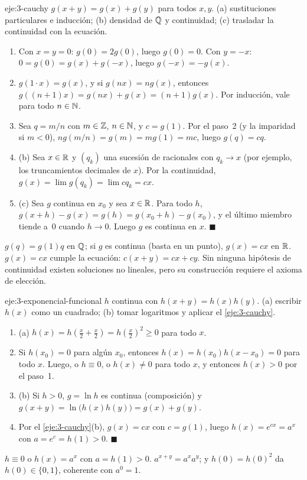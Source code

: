 \begin{solucion}{eje:3-cauchy}
\datos $g(x+y)=g(x)+g(y)$ para todos $x,y$.
\planteamiento (a) sustituciones particulares e inducción; (b) densidad de $\mathbb{Q}$ y continuidad; (c) trasladar la continuidad con la ecuación.
\pasos
\begin{enumerate}[label=\arabic*.]
  \item Con $x=y=0$: $g(0)=2g(0)$, luego $g(0)=0$. Con $y=-x$: $0=g(0)=g(x)+g(-x)$, luego $g(-x)=-g(x)$.
  \item $g(1\cdot x)=g(x)$, y si $g(nx)=ng(x)$, entonces $g((n+1)x)=g(nx)+g(x)=(n+1)g(x)$. Por inducción, vale para todo $n\in\mathbb{N}$.
  \item Sea $q=m/n$ con $m\in\mathbb{Z}$, $n\in\mathbb{N}$, y $c=g(1)$. Por el paso~2 (y la imparidad si $m<0$), $ng(m/n)=g(m)=mg(1)=mc$, luego $g(q)=cq$.
  \item (b) Sea $x\in\mathbb{R}$ y $(q_k)$ una sucesión de racionales con $q_k\to x$ (por ejemplo, los truncamientos decimales de $x$). Por la continuidad, $g(x)=\lim g(q_k)=\lim cq_k=cx$.
  \item (c) Sea $g$ continua en $x_0$ y sea $x\in\mathbb{R}$. Para todo $h$, $g(x+h)-g(x)=g(h)=g(x_0+h)-g(x_0)$, y el último miembro tiende a~0 cuando $h\to0$. Luego $g$ es continua en $x$. \hfill$\blacksquare$
\end{enumerate}
\resultado $g(q)=g(1)q$ en $\mathbb{Q}$; si $g$ es continua (basta en un punto), $g(x)=cx$ en $\mathbb{R}$.
\comprobacion $g(x)=cx$ cumple la ecuación: $c(x+y)=cx+cy$. Sin ninguna hipótesis de continuidad existen soluciones no lineales, pero su construcción requiere el axioma de elección.
\end{solucion}

\begin{solucion}{eje:3-exponencial-funcional}
\datos $h$ continua con $h(x+y)=h(x)h(y)$.
\planteamiento (a) escribir $h(x)$ como un cuadrado; (b) tomar logaritmos y aplicar el \cref{eje:3-cauchy}.
\pasos
\begin{enumerate}[label=\arabic*.]
  \item (a) $h(x)=h(\frac x2+\frac x2)=h(\frac x2)^{2}\ge0$ para todo $x$.
  \item Si $h(x_0)=0$ para algún $x_0$, entonces $h(x)=h(x_0)h(x-x_0)=0$ para todo $x$. Luego, o $h\equiv0$, o $h(x)\ne0$ para todo $x$, y entonces $h(x)>0$ por el paso~1.
  \item (b) Si $h>0$, $g=\ln h$ es continua (composición) y $g(x+y)=\ln\bigl(h(x)h(y)\bigr)=g(x)+g(y)$.
  \item Por el \cref{eje:3-cauchy}(b), $g(x)=cx$ con $c=g(1)$, luego $h(x)=e^{cx}=a^{x}$ con $a=e^{c}=h(1)>0$. \hfill$\blacksquare$
\end{enumerate}
\resultado $h\equiv0$ o $h(x)=a^{x}$ con $a=h(1)>0$.
\comprobacion $a^{x+y}=a^{x}a^{y}$; y $h(0)=h(0)^{2}$ da $h(0)\in\{0,1\}$, coherente con $a^{0}=1$.
\end{solucion}

